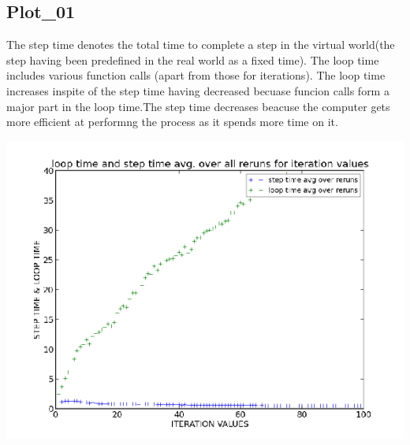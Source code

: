 \documentclass[11pt]{article}
\begin{document}
\subsection{Plot\_01}
The step time denotes the total time to complete a step in the virtual world(the step having been predefined in the real world as a fixed time).
The loop time includes various function calls (apart from those for iterations). The loop time increases inspite of the step time having decreased
becuase funcion calls form a major part in the loop time.The step time decreases beacuse the computer gets more efficient at performng the process
as it spends more time on it. 

    \begin{center}
   \includegraphics[scale=0.55]{images/g18_plot01.png}
    \end{center}
	
\end{document}
